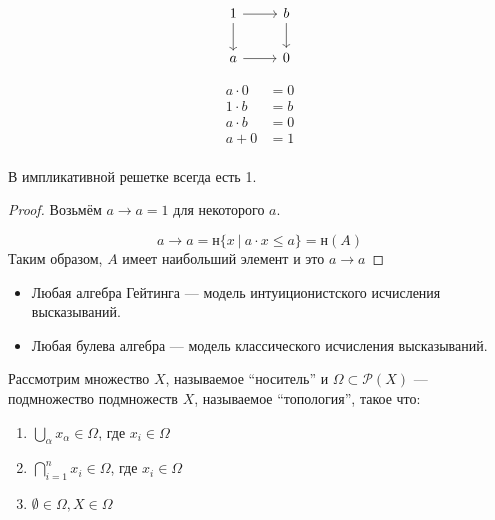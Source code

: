 \documentclass[12pt, a4paper, oneside]{book}
\begin{document}
\begin{example}
    $$\begin{tikzcd}[ampersand replacement=\&]
            1 \arrow{r} \arrow[swap]{d}{} \& b \arrow{d}{} \\
            a \arrow{r} \& 0
        \end{tikzcd}$$

    \begin{align*}
        a\cdot 0 & = 0 \\
        1\cdot b & = b \\
        a\cdot b & = 0 \\
        a + 0    & = 1 \\
    \end{align*}
\end{example}

\begin{lemma}
    В импликативной решетке всегда есть 1.
\end{lemma}
\begin{proof}
    Возьмём \(a \to a = 1\) для некоторого \(a\).

    \[a \to a = \text{н} \{x\ |\ a\cdot x \leq a\} = \text{н}(A)\]
    Таким образом, \(A\) имеет наибольший элемент и это \(a \to a\)
\end{proof}

\begin{theorem}\itemfix
    \begin{itemize}
        \item Любая алгебра Гейтинга --- модель интуиционистского исчисления высказываний.
        \item Любая булева алгебра --- модель классического исчисления высказываний.
    \end{itemize}
\end{theorem}

\begin{definition}[топология]
    Рассмотрим множество \(X\), называемое ``носитель'' и \(\Omega \subset \mathcal{P}(X)\) --- подмножество подмножеств \(X\), называемое ``топология'', такое что:
    \begin{enumerate}
        \item \(\bigcup_\alpha x_\alpha \in \Omega\), где \(x_i\in\Omega\)
        \item \(\bigcap_{i = 1}^{n} x_i \in \Omega\), где \(x_i\in\Omega\)
        \item \(\emptyset\in\Omega, X\in \Omega\)
    \end{enumerate}
\end{definition}
\end{document}

